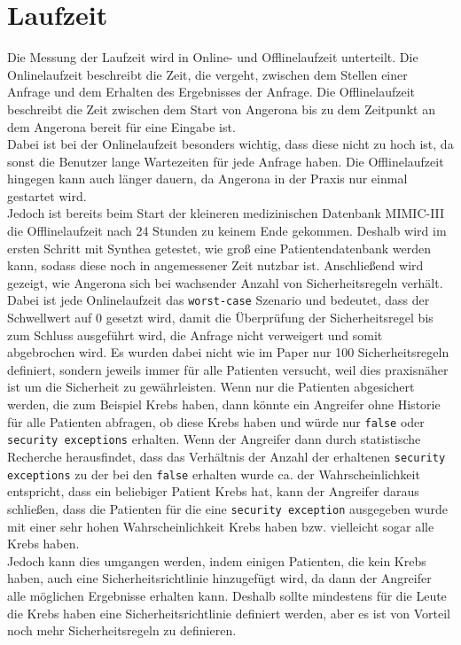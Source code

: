 \documentclass[german,version-2020-11]{uzl-thesis}
\begin{document}
\section{Laufzeit}
Die Messung der Laufzeit wird in Online- und Offlinelaufzeit unterteilt. Die Onlinelaufzeit beschreibt die Zeit, die vergeht, zwischen dem Stellen einer Anfrage und dem Erhalten des Ergebnisses der Anfrage. Die Offlinelaufzeit beschreibt die Zeit zwischen dem Start von Angerona bis zu dem Zeitpunkt an dem Angerona bereit für eine Eingabe ist. \\ 
Dabei ist bei der Onlinelaufzeit besonders wichtig, dass diese nicht zu hoch ist, da sonst die Benutzer lange Wartezeiten  für jede Anfrage haben. Die Offlinelaufzeit hingegen kann auch länger dauern, da Angerona in der Praxis nur einmal gestartet wird.  \\
Jedoch ist bereits beim Start der kleineren medizinischen Datenbank MIMIC-III die Offlinelaufzeit nach 24 Stunden zu keinem Ende gekommen. Deshalb wird im ersten Schritt mit Synthea getestet, wie groß eine Patientendatenbank werden kann, sodass diese noch in angemessener Zeit nutzbar ist.   
Anschließend wird gezeigt, wie Angerona sich bei wachsender Anzahl von Sicherheitsregeln verhält.\\ 
Dabei ist jede Onlinelaufzeit das \texttt{worst-case} Szenario und bedeutet, dass der Schwellwert auf 0 gesetzt wird, damit die Überprüfung der Sicherheitsregel bis zum Schluss ausgeführt wird, die Anfrage nicht verweigert und somit abgebrochen wird. Es wurden dabei nicht wie im Paper nur 100 Sicherheitsregeln definiert, sondern jeweils immer für alle Patienten versucht, weil dies praxisnäher ist um die Sicherheit zu gewährleisten. Wenn nur die Patienten abgesichert werden, die zum Beispiel Krebs haben, dann könnte ein Angreifer ohne Historie für alle Patienten abfragen, ob diese Krebs haben und würde nur \texttt{false} oder \texttt{security exceptions} erhalten. Wenn der Angreifer dann durch statistische Recherche herausfindet, dass das Verhältnis der Anzahl der erhaltenen \texttt{security exceptions} zu der bei den \texttt{false} erhalten wurde ca. der Wahrscheinlichkeit entspricht, dass ein beliebiger Patient Krebs hat, kann der Angreifer daraus schließen, dass die Patienten für die eine \texttt{security exception} ausgegeben wurde mit einer sehr hohen Wahrscheinlichkeit Krebs haben bzw. vielleicht sogar alle Krebs haben. \\ 
Jedoch kann dies umgangen werden, indem einigen Patienten, die kein Krebs haben, auch eine Sicherheitsrichtlinie hinzugefügt wird, da dann der Angreifer alle möglichen Ergebnisse erhalten kann. Deshalb sollte mindestens für die Leute die Krebs haben eine Sicherheitsrichtlinie definiert werden, aber es ist von Vorteil noch mehr Sicherheitsregeln zu definieren.
\end{document}

